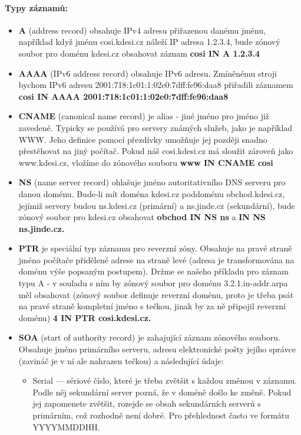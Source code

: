 \documentclass[10pt,a4paper]{article}
\begin{document}
\paragraph{Typy záznamů:}
\begin{itemize}
	\item \textbf{A} (address record) obsahuje IPv4 adresu přiřazenou danému jménu, například když jménu cosi.kdesi.cz náleží IP adresa 1.2.3.4, bude zónový soubor pro doménu kdesi.cz obsahovat záznam \textbf{cosi IN A 1.2.3.4}
	\item \textbf{AAAA} (IPv6 address record) obsahuje IPv6 adresu. Zmíněnému stroji bychom IPv6 adresu 2001:718:1c01:1:02e0:7dff:fe96:daa8 přiřadili záznamem \textbf{cosi IN AAAA 2001:718:1c01:1:02e0:7dff:fe96:daa8}
	\item \textbf{CNAME} (canonical name record) je alias - jiné jméno pro jméno již zavedené. Typicky se používá pro servery známých služeb, jako je například WWW. Jeho definice pomocí přezdívky umožňuje jej později snadno přestěhovat na jiný počítač. Pokud náš cosi.kdesi.cz má sloužit zároveň jako www.kdesi.cz, vložíme do zónového souboru \textbf{www IN CNAME cosi}
	\item \textbf{NS} (name server record) ohlašuje jméno autoritativního DNS serveru pro danou doménu. Bude-li mít doména kdesi.cz poddoménu obchod.kdesi.cz, jejímiž servery budou ns.kdesi.cz (primární) a ns.jinde.cz (sekundární), bude zónový soubor pro kdesi.cz obsahovat \textbf{obchod IN NS ns} a \textbf{IN NS ns.jinde.cz.}
	\item \textbf{PTR} je speciální typ záznamu pro reverzní zóny. Obsahuje na pravé straně jméno počítače přidělené adrese na straně levé (adresa je transformována na doménu výše popsaným postupem). Držme se našeho příkladu pro záznam typu A - v souladu s ním by zónový soubor pro doménu 3.2.1.in-addr.arpa měl obsahovat (zónový soubor definuje reverzní doménu, proto je třeba psát na pravé straně kompletní jméno s tečkou, jinak by za ně připojil reverzní doménu) \textbf{4 IN PTR cosi.kdesi.cz.}
	\item \textbf{SOA} (start of authority record) je zahajující záznam zónového souboru. Obsahuje jméno primárního serveru, adresu elektronické pošty jejího správce (zavináč je v ní ale nahrazen tečkou) a následující údaje:
	\begin{itemize}
		\item Serial — sériové číslo, které je třeba zvětšit s každou změnou v záznamu. Podle něj sekundární server pozná, že v doméně došlo ke změně. Pokud jej zapomenete zvětšit, rozejde se obsah sekundárních serverů s primárním, což rozhodně není dobré. Pro přehlednost často ve formátu YYYYMMDDHH.

\end{itemize}
\end{itemize}
\end{document}
